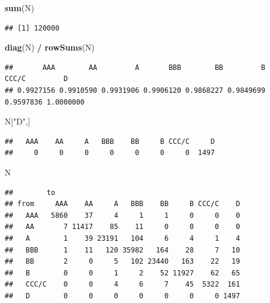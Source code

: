 \documentclass[
  11pt,
]{article}
\newenvironment{Shaded}{\begin{snugshade}}{\end{snugshade}}
\newcommand{\FunctionTok}[1]{\textcolor[rgb]{0.13,0.29,0.53}{\textbf{#1}}}
\newcommand{\NormalTok}[1]{#1}
\newcommand{\SpecialCharTok}[1]{\textcolor[rgb]{0.81,0.36,0.00}{\textbf{#1}}}
\newcommand{\StringTok}[1]{\textcolor[rgb]{0.31,0.60,0.02}{#1}}
\begin{document}
\begin{Shaded}
\begin{Highlighting}[]
\FunctionTok{sum}\NormalTok{(N)}
\end{Highlighting}
\end{Shaded}

\begin{verbatim}
## [1] 120000
\end{verbatim}

\begin{Shaded}
\begin{Highlighting}[]
\FunctionTok{diag}\NormalTok{(N) }\SpecialCharTok{/} \FunctionTok{rowSums}\NormalTok{(N)}
\end{Highlighting}
\end{Shaded}

\begin{verbatim}
##       AAA        AA         A       BBB        BB         B     CCC/C         D 
## 0.9927156 0.9910590 0.9931906 0.9906120 0.9868227 0.9849699 0.9597836 1.0000000
\end{verbatim}

\begin{Shaded}
\begin{Highlighting}[]
\NormalTok{N[}\StringTok{"D"}\NormalTok{,]}
\end{Highlighting}
\end{Shaded}

\begin{verbatim}
##   AAA    AA     A   BBB    BB     B CCC/C     D 
##     0     0     0     0     0     0     0  1497
\end{verbatim}

\begin{Shaded}
\begin{Highlighting}[]
\NormalTok{N}
\end{Highlighting}
\end{Shaded}

\begin{verbatim}
##        to
## from     AAA    AA     A   BBB    BB     B CCC/C    D
##   AAA   5860    37     4     1     1     0     0    0
##   AA       7 11417    85    11     0     0     0    0
##   A        1    39 23191   104     6     4     1    4
##   BBB      1    11   120 35982   164    28     7   10
##   BB       2     0     5   102 23440   163    22   19
##   B        0     0     1     2    52 11927    62   65
##   CCC/C    0     0     4     6     7    45  5322  161
##   D        0     0     0     0     0     0     0 1497
\end{verbatim}
\end{document}
